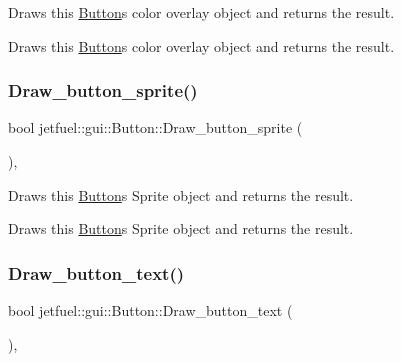 Draws this \hyperlink{classjetfuel_1_1gui_1_1Button}{Button}\textquotesingle{}s color overlay object and returns the result. 

Draws this \hyperlink{classjetfuel_1_1gui_1_1Button}{Button}\textquotesingle{}s color overlay object and returns the result. \mbox{\label{classjetfuel_1_1gui_1_1Button_a548ffd5860aced3206da4c210b5496c9}} 
\subsubsection{\texorpdfstring{Draw\+\_\+button\+\_\+sprite()}{Draw\_button\_sprite()}}
{\footnotesize\ttfamily bool jetfuel\+::gui\+::\+Button\+::\+Draw\+\_\+button\+\_\+sprite (\begin{DoxyParamCaption}{ }\end{DoxyParamCaption})\hspace{0.3cm}{\ttfamily [inline]}, {\ttfamily [protected]}}



Draws this \hyperlink{classjetfuel_1_1gui_1_1Button}{Button}\textquotesingle{}s Sprite object and returns the result. 

Draws this \hyperlink{classjetfuel_1_1gui_1_1Button}{Button}\textquotesingle{}s Sprite object and returns the result. \mbox{\label{classjetfuel_1_1gui_1_1Button_ae001860ae9ce670073a4608811e70cfe}} 
\subsubsection{\texorpdfstring{Draw\+\_\+button\+\_\+text()}{Draw\_button\_text()}}
{\footnotesize\ttfamily bool jetfuel\+::gui\+::\+Button\+::\+Draw\+\_\+button\+\_\+text (\begin{DoxyParamCaption}{ }\end{DoxyParamCaption})\hspace{0.3cm}{\ttfamily [inline]}, {\ttfamily [protected]}}



